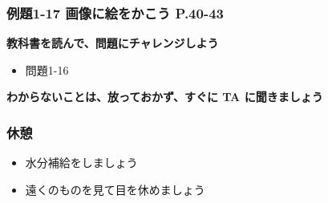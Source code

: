 \documentclass[dvipdfmx]{beamer}
\begin{document}
\begin{frame}[fragile]
	\frametitle{例題1-17 画像に絵をかこう P.40-43~~~}
          \large\textbf{教科書を読んで、問題にチャレンジしよう}
          \begin{itemize}
            \item 問題1-16
          \end{itemize}
          \vfill
          \large\textbf{わからないことは、放っておかず、すぐに TA に聞きましょう}
\end{frame}

\begin{frame}[fragile]
	\frametitle{休憩~~~}
	\huge
      \begin{itemize}
           \item 水分補給をしましょう
           \item 遠くのものを見て目を休めましょう
     \end{itemize}
\end{frame}
\end{document}
